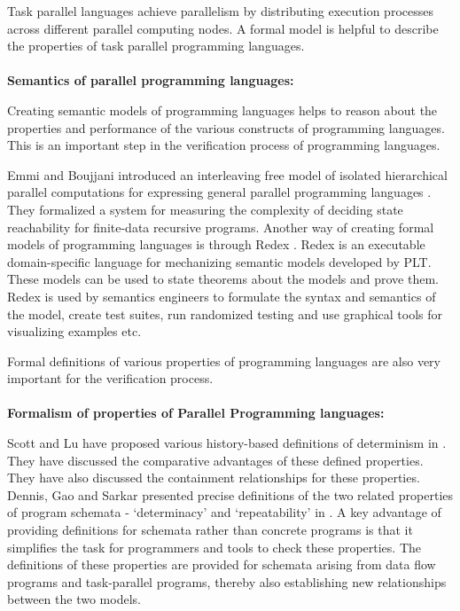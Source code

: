 Task parallel languages achieve parallelism by distributing execution processes across different parallel computing nodes. A formal model is helpful to describe the properties of task parallel programming languages. 
\\
\\
\textbf{Semantics of parallel programming languages:} 

Creating semantic models of programming languages helps to reason about the properties and performance of the various constructs of programming languages. This is an important step in the verification process of programming languages.

Emmi and Boujjani introduced an interleaving free model of isolated hierarchical parallel computations for expressing general parallel programming languages \cite{bouajjani2012analysis}. They formalized a system for measuring the complexity of deciding state reachability for finite-data recursive programs. Another way of creating formal models of programming languages is through Redex \cite{klein2012run}. Redex is an executable domain-specific language for mechanizing semantic models developed by PLT. These models can be used to state theorems about the models and prove them. Redex is used by semantics engineers to formulate the syntax and semantics of the model, create test suites, run randomized testing and use graphical tools for visualizing examples etc.

Formal definitions of various properties of programming languages are also very important for the verification process.
\\
\\
\textbf{Formalism of properties of Parallel Programming languages:}

Scott and Lu have proposed various history-based definitions of determinism in \cite{lu2011toward}. They have discussed the comparative advantages of these defined properties. They have also discussed the containment relationships for these properties. Dennis, Gao and Sarkar presented precise definitions of the two related properties of program schemata - ‘determinacy’ and ‘repeatability’ in \cite{dennis2012determinacy}. A key advantage of providing definitions for schemata rather than concrete programs is that it simplifies the task for programmers and tools to check these properties. The definitions of these properties are provided for schemata arising from data flow programs and task-parallel programs, thereby also establishing new relationships between the two models.

